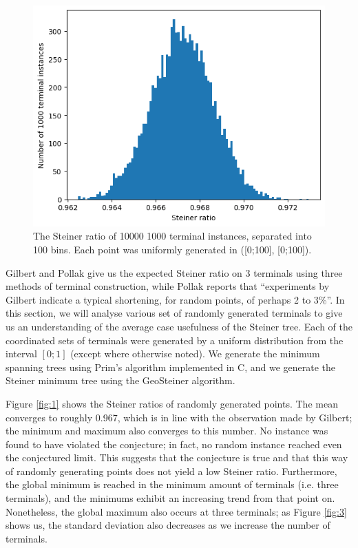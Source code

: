 \documentclass{mpaper}
\begin{document}
\begin{figure}
  \begin{center}
  \includegraphics[scale=0.5]{plot6.png}
  \end{center}
  \caption{\label{fig:6} The Steiner ratio of 10000 1000 terminal instances, separated into 100 bins. Each point was uniformly generated in ([0;100], [0;100]).}
\end{figure}

 Gilbert and Pollak \cite{GP1968} give us the expected Steiner ratio on 3 terminals using three methods of terminal construction, while Pollak \cite{POLLAK1978278} reports that ``experiments by Gilbert indicate a typical shortening, for random points, of perhaps 2 to 3\%''. In this section, we will analyse various set of randomly generated terminals to give us an understanding of the average case usefulness of the Steiner tree. Each of the coordinated sets of terminals were generated by a uniform distribution from the interval $[0;1]$ (except where otherwise noted). We generate the minimum spanning trees using Prim's algorithm implemented in C, and we generate the Steiner minimum tree using the GeoSteiner algorithm.

Figure \ref{fig:1} shows the Steiner ratios of randomly generated points. The mean converges to roughly 0.967,  which is in line with the observation made by Gilbert; the minimum and maximum also converges to this number. No instance was found to have violated the conjecture; in fact, no random instance reached even the conjectured limit. This suggests that the conjecture is true and that this way of randomly generating points does not yield a low Steiner ratio. Furthermore, the global minimum is reached in the minimum amount of terminals (i.e. three terminals), and the minimums exhibit an increasing trend from that point on. Nonetheless, the global maximum also occurs at three terminals; as Figure \ref{fig:3} shows us, the standard deviation also decreases as we increase the number of terminals.
\end{document}

